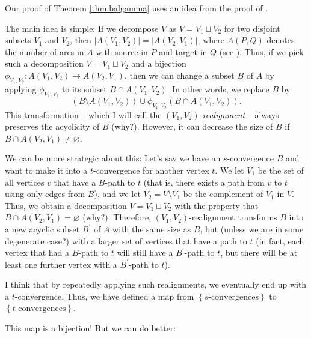 \documentclass[numbers=enddot,12pt,final,onecolumn,notitlepage]{scrartcl}%
\theoremstyle{definition}
\theoremstyle{plainsl}
\begin{document}
Our proof of Theorem \ref{thm.balgamma} uses an idea from the proof of
\cite[Proposition 3.7]{PerPha15}.

The main idea is simple: If we decompose $V$ as $V=V_{1}\sqcup V_{2}$ for two
disjoint subsets $V_{1}$ and $V_{2}$, then $\left\vert A\left(  V_{1}%
,V_{2}\right)  \right\vert =\left\vert A\left(  V_{2},V_{1}\right)
\right\vert $, where $A\left(  P,Q\right)  $ denotes the number of arcs in $A$
with source in $P$ and target in $Q$ (see \cite[Exercise 9.1]{22s}). Thus, if
we pick such a decomposition $V=V_{1}\sqcup V_{2}$ and a bijection
$\phi_{V_{1},V_{2}}:A\left(  V_{1},V_{2}\right)  \rightarrow A\left(
V_{2},V_{1}\right)  $, then we can change a subset $B$ of $A$ by applying
$\phi_{V_{1},V_{2}}$ to its subset $B\cap A\left(  V_{1},V_{2}\right)  $. In
other words, we replace $B$ by%
\[
\left(  B\setminus A\left(  V_{1},V_{2}\right)  \right)  \cup\phi_{V_{1}%
,V_{2}}\left(  B\cap A\left(  V_{1},V_{2}\right)  \right)  .
\]
This transformation -- which I will call the $\left(  V_{1},V_{2}\right)
$\emph{-realignment} -- always preserves the acyclicity of $B$ (why?).
However, it can decrease the size of $B$ if $B\cap A\left(  V_{2}%
,V_{1}\right)  \neq\varnothing$.

We can be more strategic about this: Let's say we have an $s$-convergence $B$
and want to make it into a $t$-convergence for another vertex $t$. We let
$V_{1}$ be the set of all vertices $v$ that have a $B$-path to $t$ (that is,
there exists a path from $v$ to $t$ using only edges from $B$), and we let
$V_{2}=V\setminus V_{1}$ be the complement of $V_{1}$ in $V$. Thus, we obtain
a decomposition $V=V_{1}\sqcup V_{2}$ with the property that $B\cap A\left(
V_{2},V_{1}\right)  =\varnothing$ (why?). Therefore, $\left(  V_{1}%
,V_{2}\right)  $-realignment transforms $B$ into a new acyclic subset
$B^{\prime}$ of $A$ with the same size as $B$, but (unless we are in some
degenerate case?) with a larger set of vertices that have a path to $t$ (in
fact, each vertex that had a $B$-path to $t$ will still have a $B^{\prime}%
$-path to $t$, but there will be at least one further vertex with a
$B^{\prime}$-path to $t$).

I think that by repeatedly applying such realignments, we eventually end up
with a $t$-convergence. Thus, we have defined a map from $\left\{
s\text{-convergences}\right\}  $ to $\left\{  t\text{-convergences}\right\}  $.

This map is a bijection! But we can do better:
\end{document}
